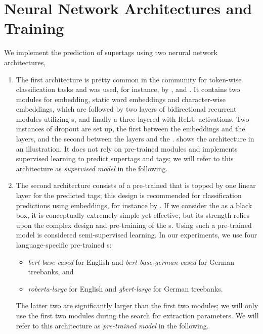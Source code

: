 \documentclass[../../document.tex]{subfiles}
\begin{document}
    \section{Neural Network Architectures and Training}\label{sec:models}
    We implement the prediction of supertags using two nerural network architectures, 
    \begin{enumerate}
        \item
            The first architecture is pretty common in the  community for token-wise classification tasks and was used, for instance, by \citet{vaswani2016supertagging}, \citet{StaSte20} and \citet{Cor20}.
            It contains two modules for embedding, static word embeddings and character-wise embeddings, which are followed by two layers of bidirectional recurrent modules utilizing s, and finally a three-layered  with ReLU activations.
            Two instances of dropout are set up, the first between the embeddings and the  layers, and the second between the  layers and the .
             shows the architecture in an illustration.
            It does not rely on pre-trained modules and implements supervised learning to predict supertags and  tags; we will refer to this architecture as \emph{supervised model} in the following.
        \item
            The second architecture consists of a pre-trained  that is topped by one linear layer for the predicted tags; this design is recommended for classification predictions using  embeddings, for instance by \citet{Devlin2019}.
            If we consider the  as a black box, it is conceptually extremely simple yet effective, but its strength relies upon the complex design and pre-training of the s.
            Using such a pre-trained model is considered semi-supervised learning.
            In our experiments, we use four language-specific pre-trained s:
            \begin{itemize}
                \item \emph{bert-base-cased} for English and \emph{bert-base-german-cased} \citep{Devlin2019} for German treebanks, and
                \item \emph{roberta-large} \citep{roberta} for English and \emph{gbert-large} \citep{Cha20} for German treebanks.
            \end{itemize}
            The latter two are significantly larger than the first two modules; we will only use the first two modules during the search for extraction parameters.
            We will refer to this architecture as \emph{pre-trained model} in the following.
    \end{enumerate}
\end{document}
